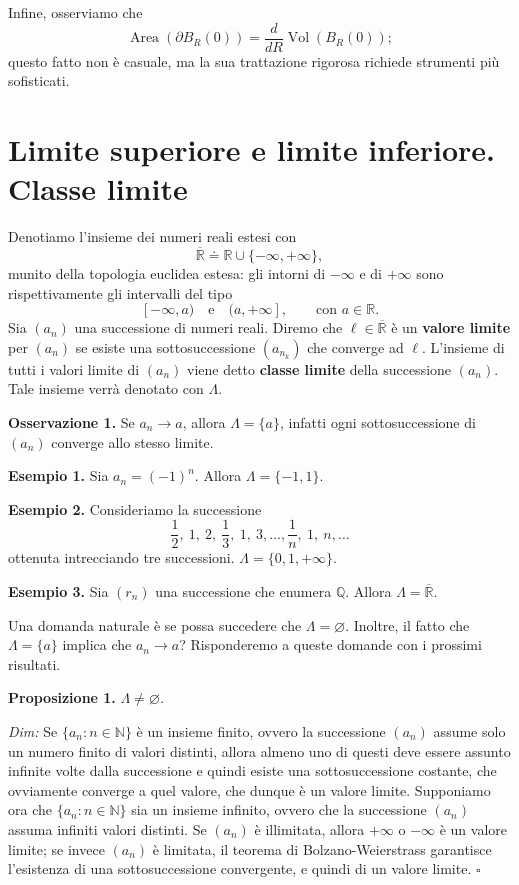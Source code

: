\documentclass[11pt,a4paper]{article}
\newcommand{\R}{\mathbb{R}}
\newcommand{\N}{\mathbb{N}}
\newcommand{\Q}{\mathbb{Q}}
\newcommand{\Rbar}{\overline{\mathbb{R}}}
\newcommand{\result}[2]{\par\medskip\noindent\textbf{#1} \textit{#2}\par}
\newcommand{\proofit}{\par\medskip\noindent\textit{Dim:} }
\newcommand{\qedherecustom}{\hfill$\square$}
\begin{document}
Infine, osserviamo che
\[
\operatorname{Area}(\partial B_R(0))
=\frac{d}{dR}\operatorname{Vol}(B_R(0));
\]
questo fatto non è casuale, ma la sua trattazione rigorosa richiede strumenti più sofisticati.

\section{Limite superiore e limite inferiore. Classe limite}

Denotiamo l'insieme dei numeri reali estesi con
\[
\Rbar\doteq\R\cup\{-\infty,+\infty\},
\]
munito della topologia euclidea estesa: gli intorni di $-\infty$ e di $+\infty$ sono rispettivamente gli intervalli del tipo
\[
[-\infty,a)\quad\text{e}\quad(a,+\infty],\qquad\text{con }a\in\R.
\]
Sia $(a_n)$ una successione di numeri reali. Diremo che $\ell\in\Rbar$ è un \textbf{valore limite} per $(a_n)$ se esiste una sottosuccessione $(a_{n_k})$ che converge ad $\ell$. L'insieme di tutti i valori limite di $(a_n)$ viene detto \textbf{classe limite} della successione $(a_n)$. Tale insieme verrà denotato con $\Lambda$.

\noindent\textbf{Osservazione 1.} Se $a_n\to a$, allora $\Lambda=\{a\}$, infatti ogni sottosuccessione di $(a_n)$ converge allo stesso limite.

\noindent\textbf{Esempio 1.} Sia $a_n=(-1)^n$. Allora $\Lambda=\{-1,1\}$.

\noindent\textbf{Esempio 2.} Consideriamo la successione
\[
\frac12,\ 1,\ 2,\ \frac13,\ 1,\ 3,\ldots,\frac1n,\ 1,\ n,\ldots
\]
ottenuta intrecciando tre successioni. $\Lambda=\{0,1,+\infty\}$.

\noindent\textbf{Esempio 3.} Sia $(r_n)$ una successione che enumera $\Q$. Allora $\Lambda=\Rbar$.

Una domanda naturale è se possa succedere che $\Lambda=\varnothing$. Inoltre, il fatto che $\Lambda=\{a\}$ implica che $a_n\to a$? Risponderemo a queste domande con i prossimi risultati.

\result{Proposizione 1.}{$\Lambda\neq\varnothing$.}

\proofit Se $\{a_n:n\in\N\}$ è un insieme finito, ovvero la successione $(a_n)$ assume solo un numero finito di valori distinti, allora almeno uno di questi deve essere assunto infinite volte dalla successione e quindi esiste una sottosuccessione costante, che ovviamente converge a quel valore, che dunque è un valore limite. Supponiamo ora che $\{a_n:n\in\N\}$ sia un insieme infinito, ovvero che la successione $(a_n)$ assuma infiniti valori distinti. Se $(a_n)$ è illimitata, allora $+\infty$ o $-\infty$ è un valore limite; se invece $(a_n)$ è limitata, il teorema di Bolzano-Weierstrass garantisce l'esistenza di una sottosuccessione convergente, e quindi di un valore limite. \qedherecustom
\end{document}
